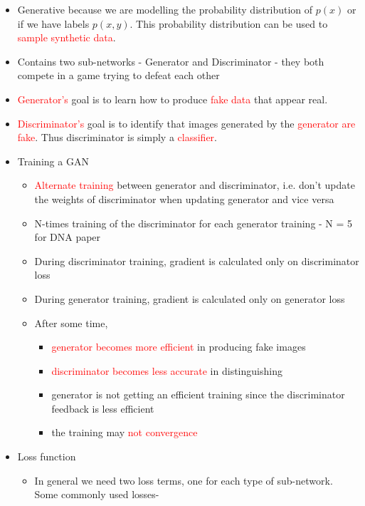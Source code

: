 \documentclass[11pt]{article}
\newcommand{\red}[1]{\textcolor{red}{#1}}
\begin{document}
    \begin{itemize}
        \item Generative because we are modelling the probability distribution of $p(x)$ or if we have labels $p(x,y)$. This probability distribution can be used to \red{sample synthetic data}.
        \item Contains two sub-networks - Generator and Discriminator - they both compete in a game trying to defeat each other
        \item \red{Generator's} goal is to learn how to produce \red{fake data} that appear real.
        \item \red{Discriminator's} goal is to identify that images generated by the \red{generator are fake}. Thus discriminator is simply a \red{classifier}.
        \item Training a GAN
        \begin{itemize}
            \item \red{Alternate training} between generator and discriminator, i.e. don't update the weights of discriminator when updating generator and vice versa
            \item N-times training of the discriminator for each generator training - N = 5 for DNA paper
            \item During discriminator training, gradient is calculated only on discriminator loss
            \item During generator training, gradient is calculated only on generator loss
            \item After some time,
            \begin{itemize}
                \item \red{generator becomes more efficient} in producing fake images
                \item \red{discriminator becomes less accurate} in distinguishing
                \item generator is not getting an efficient training since the discriminator feedback is less efficient
                \item the training may \red{not convergence}
            \end{itemize}
        \end{itemize}
        \item Loss function
        \begin{itemize}
            \item In general we need two loss terms, one for each type of sub-network. Some commonly used losses-

\end{itemize}
\end{itemize}
\end{document}

